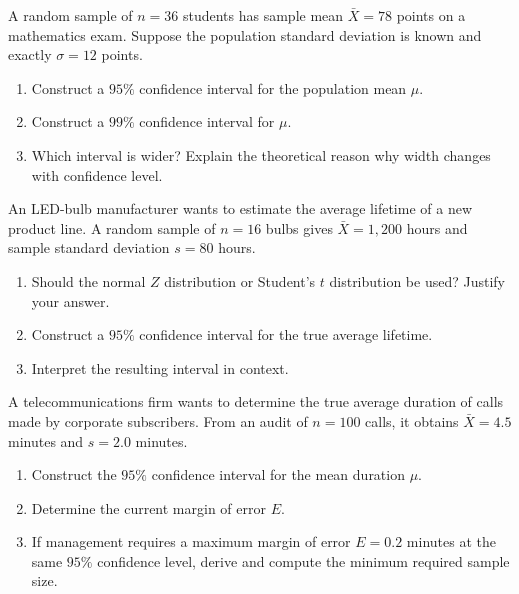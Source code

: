 \begin{problema}\label{prob:39c2251}
A random sample of $n=36$ students has sample mean $\bar X=78$ points on a mathematics exam. Suppose the population standard deviation is known and exactly $\sigma=12$ points.
\begin{enumerate}[label=(\alph*)]
	\item Construct a $95\%$ confidence interval for the population mean $\mu$.
	\item Construct a $99\%$ confidence interval for $\mu$.
	\item Which interval is wider? Explain the theoretical reason why width changes with confidence level.
\end{enumerate}
\end{problema}

\begin{problema}\label{prob:8fd99c8}
An LED-bulb manufacturer wants to estimate the average lifetime of a new product line. A random sample of $n=16$ bulbs gives $\bar X=1{,}200$ hours and sample standard deviation $s=80$ hours.
\begin{enumerate}[label=(\alph*)]
	\item Should the normal $Z$ distribution or Student's $t$ distribution be used? Justify your answer.
	\item Construct a $95\%$ confidence interval for the true average lifetime.
	\item Interpret the resulting interval in context.
\end{enumerate}
\end{problema}

\begin{problema}\label{prob:6af5954}
A telecommunications firm wants to determine the true average duration of calls made by corporate subscribers. From an audit of $n=100$ calls, it obtains $\bar X=4.5$ minutes and $s=2.0$ minutes.
\begin{enumerate}[label=(\alph*)]
	\item Construct the $95\%$ confidence interval for the mean duration $\mu$.
	\item Determine the current margin of error $E$.
	\item If management requires a maximum margin of error $E=0.2$ minutes at the same $95\%$ confidence level, derive and compute the minimum required sample size.
\end{enumerate}
\end{problema}

